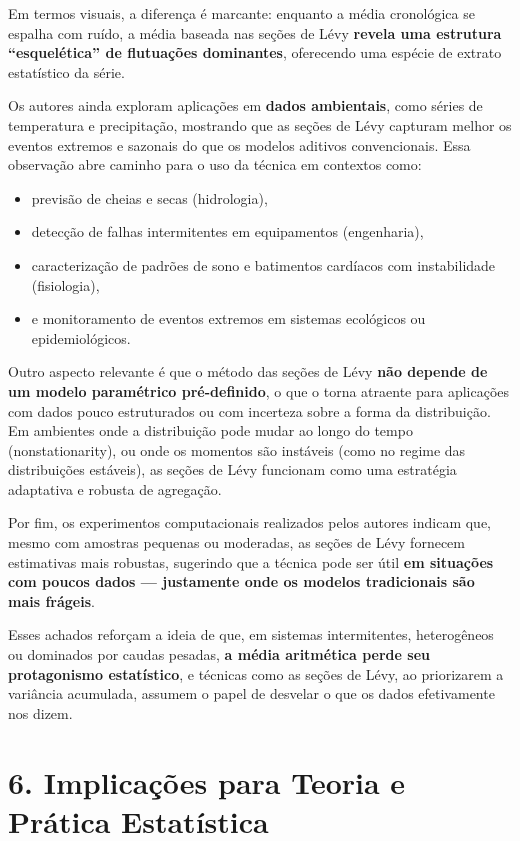 \documentclass[
  portuguese,
]{agujournal2019}
\providecommand{\tightlist}{%
  \setlength{\itemsep}{0pt}\setlength{\parskip}{0pt}}
\begin{document}
Em termos visuais, a diferença é marcante: enquanto a média cronológica
se espalha com ruído, a média baseada nas seções de Lévy \textbf{revela
uma estrutura ``esquelética'' de flutuações dominantes}, oferecendo uma
espécie de extrato estatístico da série.

Os autores ainda exploram aplicações em \textbf{dados ambientais}, como
séries de temperatura e precipitação, mostrando que as seções de Lévy
capturam melhor os eventos extremos e sazonais do que os modelos
aditivos convencionais. Essa observação abre caminho para o uso da
técnica em contextos como:

\begin{itemize}
\tightlist
\item
  previsão de cheias e secas (hidrologia),
\item
  detecção de falhas intermitentes em equipamentos (engenharia),
\item
  caracterização de padrões de sono e batimentos cardíacos com
  instabilidade (fisiologia),
\item
  e monitoramento de eventos extremos em sistemas ecológicos ou
  epidemiológicos.
\end{itemize}

Outro aspecto relevante é que o método das seções de Lévy \textbf{não
depende de um modelo paramétrico pré-definido}, o que o torna atraente
para aplicações com dados pouco estruturados ou com incerteza sobre a
forma da distribuição. Em ambientes onde a distribuição pode mudar ao
longo do tempo (nonstationarity), ou onde os momentos são instáveis
(como no regime das distribuições estáveis), as seções de Lévy funcionam
como uma estratégia adaptativa e robusta de agregação.

Por fim, os experimentos computacionais realizados pelos autores indicam
que, mesmo com amostras pequenas ou moderadas, as seções de Lévy
fornecem estimativas mais robustas, sugerindo que a técnica pode ser
útil \textbf{em situações com poucos dados --- justamente onde os
modelos tradicionais são mais frágeis}.

Esses achados reforçam a ideia de que, em sistemas intermitentes,
heterogêneos ou dominados por caudas pesadas, \textbf{a média aritmética
perde seu protagonismo estatístico}, e técnicas como as seções de Lévy,
ao priorizarem a variância acumulada, assumem o papel de desvelar o que
os dados efetivamente nos dizem.

\section{6. Implicações para Teoria e Prática
Estatística}\label{implicauxe7uxf5es-para-teoria-e-pruxe1tica-estatuxedstica}
\end{document}

